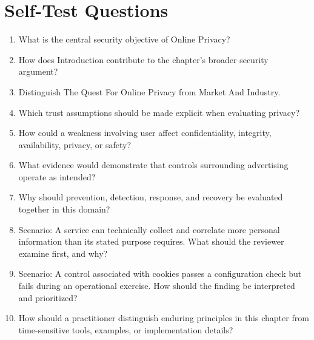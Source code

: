 \documentclass[11pt]{article}
\begin{document}
\section*{Self-Test Questions}
\begin{enumerate}
\item What is the central security objective of Online Privacy?
\item How does Introduction contribute to the chapter's broader security argument?
\item Distinguish The Quest For Online Privacy from Market And Industry.
\item Which trust assumptions should be made explicit when evaluating privacy?
\item How could a weakness involving user affect confidentiality, integrity, availability, privacy, or safety?
\item What evidence would demonstrate that controls surrounding advertising operate as intended?
\item Why should prevention, detection, response, and recovery be evaluated together in this domain?
\item Scenario: A service can technically collect and correlate more personal information than its stated purpose requires. What should the reviewer examine first, and why?
\item Scenario: A control associated with cookies passes a configuration check but fails during an operational exercise. How should the finding be interpreted and prioritized?
\item How should a practitioner distinguish enduring principles in this chapter from time-sensitive tools, examples, or implementation details?
\end{enumerate}
\end{document}

